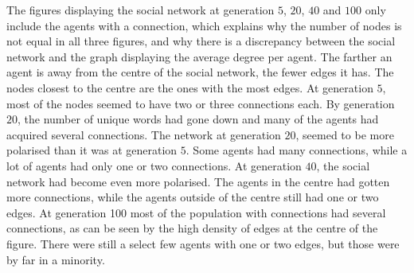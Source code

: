 The figures displaying the social network at generation $5$, $20$, $40$ and $100$ only include the agents with a connection, which explains why the number of nodes is not equal in all three figures, and why there is a discrepancy between the social network and the graph displaying the average degree per agent. The farther an agent is away from the centre of the social network, the fewer edges it has. The nodes closest to the centre are the ones with the most edges. At generation $5$, most of the nodes seemed to have two or three connections each. By generation $20$, the number of unique words had gone down and many of the agents had acquired several connections. The network at generation $20$, seemed to be more polarised than it was at generation $5$. Some agents had many connections, while a lot of agents had only one or two connections. At generation $40$, the social network had become even more polarised. The agents in the centre had gotten more connections, while the agents outside of the centre still had one or two edges. At generation 100 most of the population with connections had several connections, as can be seen by the high density of edges at the centre of the figure. There were still a select few agents with one or two edges, but those were by far in a minority.

